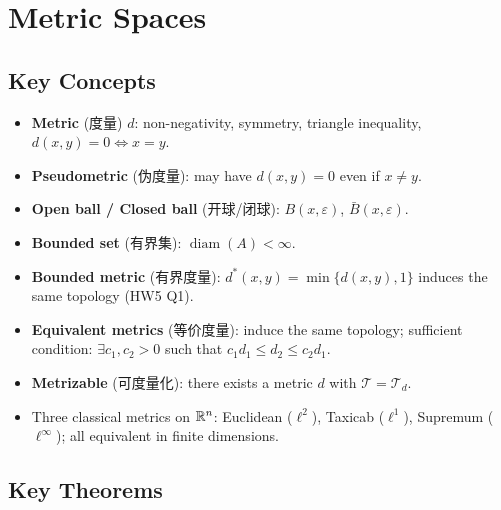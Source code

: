 \documentclass{article}
\begin{document}
\section{Metric Spaces}

\subsection{Key Concepts}

\begin{itemize}
  \item \textbf{Metric} (度量) $d$: non-negativity, symmetry, triangle inequality,
  $d(x,y)=0\iff x=y$.
  \item \textbf{Pseudometric} (伪度量): may have $d(x,y)=0$ even if $x\neq y$.
  \item \textbf{Open ball / Closed ball} (开球/闭球): $B(x,\varepsilon)$, $\bar{B}(x,\varepsilon)$.
  \item \textbf{Bounded set} (有界集): $\operatorname{diam}(A)<\infty$.
  \item \textbf{Bounded metric} (有界度量): $d^*(x,y)=\min\{d(x,y),1\}$
  induces the same topology (HW5 Q1).
  \item \textbf{Equivalent metrics} (等价度量): induce the same topology;
  sufficient condition: $\exists c_1,c_2>0$ such that $c_1d_1\le d_2\le c_2d_1$.
  \item \textbf{Metrizable} (可度量化): there exists a metric $d$ with $\mathcal{T}=\mathcal{T}_d$.
  \item Three classical metrics on $\mathbb{R}^n$: Euclidean ($\ell^2$), Taxicab ($\ell^1$),
  Supremum ($\ell^\infty$); all equivalent in finite dimensions.
\end{itemize}

\subsection{Key Theorems}
\end{document}
